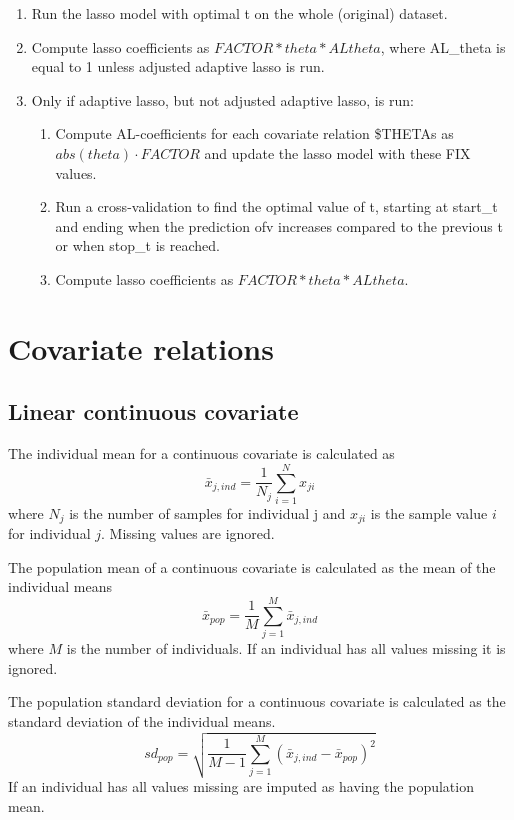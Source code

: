 \begin{enumerate}
\item Run the lasso model with optimal t on the whole (original) dataset. 
\item Compute lasso coefficients as $FACTOR*theta*ALtheta$, where AL\_theta is equal to 1 unless adjusted adaptive lasso 
is run.
\item Only if adaptive lasso, but not adjusted adaptive lasso, is run:
\begin{enumerate}
\item Compute AL-coefficients for each covariate relation \$THETAs 
as $abs(theta)\cdot FACTOR$
and update the lasso model with these FIX values.
\item Run a cross-validation to find the optimal value of t, 
starting at start\_t and ending when the prediction ofv increases compared to the
previous t or when stop\_t is reached.
\item Compute lasso coefficients as $FACTOR*theta*ALtheta$.
\end{enumerate}
\end{enumerate}

\section{Covariate relations}
\subsection{Linear continuous covariate}
The individual mean for a continuous covariate is calculated as
\[\bar{x}_{j,ind} = \frac{1}{N_j} \sum_{i=1}^N x_{ji}
\]
where $N_j$ is the number of samples for individual j and $x_{ji}$ is the sample value $i$ for individual $j$. Missing values are ignored.

The population mean of a continuous covariate is calculated as the mean of the individual means
\[\bar{x}_{pop} = \frac{1}{M} \sum_{j=1}^M \bar{x}_{j,ind}
\]
where $M$ is the number of individuals. If an individual has all values missing it is ignored.

The population standard deviation for a continuous covariate is calculated as the standard deviation of the individual means.
\[sd_{pop} = \sqrt{\frac{1}{M-1} \sum_{j=1}^M(\bar{x}_{j,ind} - \bar{x}_{pop})^2}
\]
If an individual has all values missing are imputed as having the population mean.

